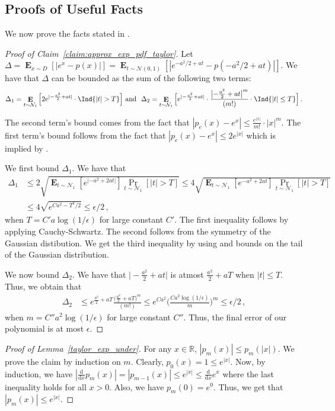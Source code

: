 \documentclass[10pt,a4paper]{article}
\DeclareMathOperator*{\E}{\mathbf{E}}
\def\d{\mathrm{d}}
\newcommand{\R}{\mathbb{R}}
\newcommand{\1}{\Ind}
\newcommand{\Gauss}{\mathcal{N}}
\begin{document}
\subsection{Proofs of Useful Facts}
\label{subsec:proof_facts}
We now prove the facts stated in .

\begin{proof}[Proof of Claim~\ref{claim:approx_exp_pdf_taylor}]
Let $\Delta=\E_{x\sim D}[|e^{x}-p(x)|]=\E_{t\sim \Gauss(0,1)}[|e^{-a^2/2+a t}-p(-a^2/2+a t)|]$.
    We have that ${\Delta}$ can be bounded as the sum of the following two terms:
    \[
        \Delta_{1}=\E_{t\sim \Gauss_1}\Big[2e^{|-\frac{a^2}{2}+at|}\cdot  
    \1\{|t|> T\}\Big] \text{ and } 
            ~\Delta_{2}=\E_{t\sim \Gauss_1}\Big[e^{|-\frac{a^2}{2}+at|}\cdot \frac{\bigl|-\frac{a^2}{2}+at\bigr|^{m}}{(m!)}\cdot 
        \1\{|t|\leq  T\}\Big]\,.\]

        The second term's bound comes from the fact that $|p_e(x)-e^{x}|\leq \frac{e^{|x|}}{m!}\cdot |x|^{m}$.
        The first term's bound follows from the fact that $|p_e(x)-e^{x}|\leq 2e^{|x|}$ which is implied by .

    We first bound $\Delta_{1}$. We have that 
    \begin{align*}
        \Delta_{1}&\leq 2\sqrt{\E_{t\sim \Gauss_1}[e^{|-a^2+2at|}]\Pr_{t\sim \Gauss_1}[|t|>T]} 
        \leq 4\sqrt{\E_{t\sim \Gauss_1}[e^{-a^2+2at}]\Pr_{t\sim \Gauss_1}[|t|>T]}\\
    &\leq 4\sqrt{e^{Ca^2-T^2/2}}\leq \epsilon/2\,,
    \end{align*}
    when $T= C'a\log(1/\epsilon)$ for large constant $C'$. The first inequality follows by applying Cauchy-Schwartz. The second follows from the symmetry of the Gaussian distibution. We get the third inequality by using  and bounds on the tail of the Gaussian distribution. 
   
    
      We now bound $\Delta_{2}$. We have that $\bigl|-\frac{a^2}{2}+at\bigr|$ is atmost $\frac{a^2}{2}+aT$ when $|t|\leq T$. Thus, we obtain that 
      \begin{align*}
        \Delta_{2}&\leq e^{\frac{a^2}{2}+aT} \frac{\bigl(\frac{a^2}{2}+aT\bigr)^{m}}{(m!)}\leq e^{Ca^2}\biggl(\frac{Ca^2\log(1/\epsilon)}{m}\biggr)^{m}\leq \epsilon/2\,, 
        \end{align*} when $m=C''a^2\log(1/\epsilon)$ for large constant $C''$. Thus, the final error of our polynomial is at most $\epsilon$.
\end{proof}
\begin{proof}[Proof of Lemma~\ref{taylor_exp_under}]
\label{proof:taylor_exp_under}
    For any $x\in \R$, $|p_m(x)|\leq p_m(|x|)$.  We prove the claim by induction on $m$. Clearly, $p_0(x)=1\leq e^{|x|}$. Now, by induction, we have $|\frac{\d}{\d x}p_m(x)|=|p_{m-1}(x)|\leq e^{|x|} \leq \frac{\d}{\d x}e^{x}$ where the last inequality holds for all $x>0$. Also, we have $p_m(0)=e^{0}$. Thus, we get that $|p_m(x)|\leq e^{|x|}$.
\end{proof}
\end{document}
